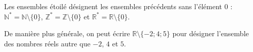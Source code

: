 \documentclass[main.tex]{subfiles}
\begin{document}
\begin{remark} Les ensembles étoilé désignent les ensembles précédents sans l'élément $0$ : $\mathbb{N}^*=\mathbb{N}\setminus\{0\}$, $\mathbb{Z}^*=\mathbb{Z}\setminus\{0\}$ et $\mathbb{R}^*=\mathbb{R}\setminus\{0\}$. 
	
	De manière plus générale, on peut écrire $\mathbb{R}\setminus\{-2; 4; 5\}$ pour désigner l'ensemble des nombres réels autre que $-2$, $4$ et $5$. 
\end{remark}
 
%	 
%	 

\newpage 
{}  
\pagestyle{scrheadings} %
\onehalfspacing
\end{document}
